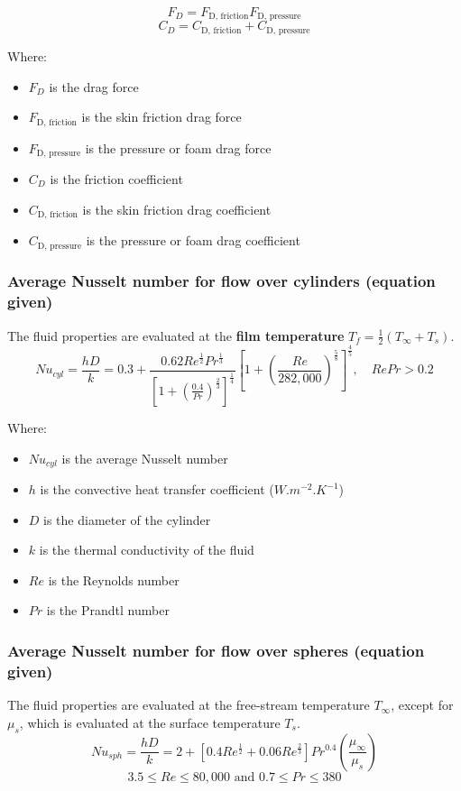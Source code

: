 \documentclass[11pt]{article}
\begin{document}
\[F_D = F_{\text{D, friction}} F_{\text{D, pressure}}\]
\[C_D = C_{\text{D, friction}} + C_{\text{D, pressure}}\]

Where:
\begin{itemize}
\item \(F_D\) is the drag force
\item \(F_{\text{D, friction}}\) is the skin friction drag force
\item \(F_{\text{D, pressure}}\) is the pressure or foam drag force
\item \(C_D\) is the friction coefficient
\item \(C_{\text{D, friction}}\) is the skin friction drag coefficient
\item \(C_{\text{D, pressure}}\) is the pressure or foam drag coefficient
\end{itemize}

 \newpage

\subsubsection{Average Nusselt number for flow over cylinders (equation given)}
\label{sec:org5ac172b}
The fluid properties are evaluated at the \textbf{film temperature} \(T_f = \frac{1}{2} (T_{\infty} + T_s)\).
\[Nu_{cyl} = \frac{hD}{k} = 0.3 + \frac{0.62 Re^{\frac{1}{2}} Pr^{\frac{1}{3}}}{\left[1 + \left(\frac{0.4}{Pr} \right)^{\frac{2}{3}} \right]^{\frac{1}{4}}} \left[1 + \left(\frac{Re}{282,000} \right)^{\frac{5}{8}} \right]^{\frac{4}{5}}, \quad RePr > 0.2\]

Where:
\begin{itemize}
\item \(Nu_{cyl}\) is the average Nusselt number
\item \(h\) is the convective heat transfer coefficient (\(\unit{W.m^{-2}.K^{-1}}\))
\item \(D\) is the diameter of the cylinder
\item \(k\) is the thermal conductivity of the fluid
\item \(Re\) is the Reynolds number
\item \(Pr\) is the Prandtl number
\end{itemize}

\subsubsection{Average Nusselt number for flow over spheres (equation given)}
\label{sec:orgc68f372}
The fluid properties are evaluated at the free-stream temperature \(T_{\infty}\), except for \(\mu_s\), which is evaluated at the surface temperature \(T_s\).
\[Nu_{sph} = \frac{hD}{k} = 2 + \left[0.4 Re^{\frac{1}{2}} + 0.06 Re^{\frac{2}{3}} \right] Pr^{0.4} \left(\frac{\mu_{\infty}}{\mu_s} \right)\]
\[3.5 \le Re \le 80,000 \text{ and } 0.7 \le Pr \le 380\]
\end{document}
